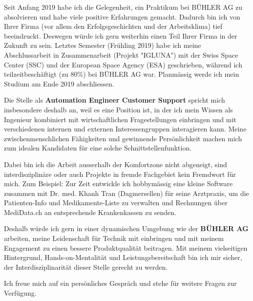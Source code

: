 \documentclass[11pt, a4paper]{awesome-cv}
\newcommand{\companyName}{BÜHLER AG }
\newcommand{\jobPosition}{Automation Engineer Customer Support }
\begin{document}
\makecvheader

\makelettertitle

\begin{cvletter}
	
Seit Anfang 2019 habe ich die Gelegenheit, ein Praktikum bei \companyName zu absolvieren und habe viele positive Erfahrungen gemacht. Dadurch bin ich  von Ihrer Firma (vor allem den Erfolgsgeschichten und der Arbeitsklima) tief beeindruckt. Deswegen würde ich gern weiterhin einen Teil Ihrer Firma in der Zukunft zu sein. Letztes Semester (Frühling 2019) habe ich meine Abschlussarbeit in Zusammenarbeit (Projekt "IGLUNA") mit der Swiss Space Center (SSC) und der European Space Agency (ESA) geschrieben, während ich teilzeitbeschäftigt (zu 80\%) bei \companyName war. Planmässig werde ich mein Studium am Ende 2019 abschliessen.	


Die Stelle als \textbf{\jobPosition} spricht mich insbesondere deshalb an, weil es eine Position ist, in der ich mein Wissen als Ingenieur kombiniert mit wirtschaftlichen Fragestellungen einbringen und mit verschiedenen internen und externen Interessengruppen interagieren kann. Meine zwischenmenschlichen Fähigkeiten und gewinnende Persönlichkeit machen mich zum idealen Kandidaten für eine solche Schnittstellenfunktion.
 
Dabei bin ich die Arbeit ausserhalb der Komfortzone nicht abgeneigt, sind interdisziplinäre oder auch Projekte in fremde Fachgebiet kein Fremdwort für mich. Zum Beispiel: Zur Zeit entwickle ich hobbymässig eine kleine Software zusammen mit Dr. med. Khanh Tran (Dagmersellen) für seine Arztpraxis, um die Patienten-Info und Medikamente-Liste zu verwalten und Rechnungen über MediData.ch an entsprechende Krankenkassen zu senden. 

Deshalb würde ich gern in einer dynamischen Umgebung wie der \textbf{\companyName} arbeiten, meine Leidenschaft für Technik mit einbringen und mit meinem Engagement zu einen bessere Produktqualität beitragen. Mit meinem vielseitigen Hintergrund, Hands-on-Mentalität und Leistungsbereitschaft bin ich mir sicher, der Interdisziplinarität dieser Stelle gerecht zu werden. 

Ich freue mich auf ein persönliches Gespräch und stehe für weitere Fragen zur Verfügung.

\end{cvletter}

\makeletterclosing
\end{document}
